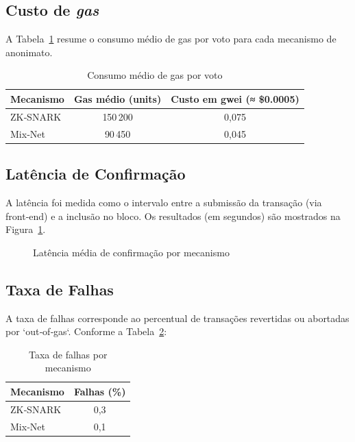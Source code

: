 \subsection{Custo de \textit{gas}}
A Tabela~\ref{tab:gas} resume o consumo médio de gas por voto para cada mecanismo de anonimato.
\begin{table}[ht!]
\centering
\caption{Consumo m{\'e}dio de gas por voto}
\label{tab:gas}
\begin{tabular}{lcc}
\toprule
Mecanismo & Gas médio (units) & Custo em gwei (≈ \$0.0005) \\
\midrule
ZK‑SNARK & 150 200 & 0,075 \\
Mix‑Net   &  90 450 & 0,045 \\
\bottomrule
\end{tabular}
\end{table}

\subsection{Latência de Confirmação}
A latência foi medida como o intervalo entre a submissão da transação (via front‑end) e a inclusão no bloco. Os resultados (em segundos) são mostrados na Figura~\ref{fig:latency}.
\begin{figure}[ht!]
\centering
{}
\caption{Latência média de confirmação por mecanismo}
\label{fig:latency}
\end{figure}

\subsection{Taxa de Falhas}
A taxa de falhas corresponde ao percentual de transações revertidas ou abortadas por `out‑of‑gas`. Conforme a Tabela~\ref{tab:failures}:
\begin{table}[ht!]
\centering
\caption{Taxa de falhas por mecanismo}
\label{tab:failures}
\begin{tabular}{lc}
\toprule
Mecanismo & Falhas (\%) \\
\midrule
ZK‑SNARK & 0,3 \\
Mix‑Net   & 0,1 \\
\bottomrule
\end{tabular}
\end{table}

